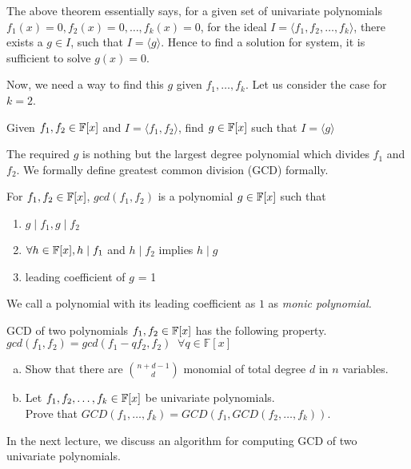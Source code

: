 The above theorem essentially says, 
for a given set of univariate polynomials $f_1(x)=0,f_2(x)=0,\ldots,f_k(x)=0$,
for the ideal $I=\langle f_1,f_2,\ldots,f_k\rangle $, there exists a $g\in I$, 
such that $I=\langle g\rangle $. Hence to find a solution for system, it 
is sufficient to solve $g(x)=0$. 

Now, we need a way to find this $g$ given $f_1,\ldots,f_k$. Let us consider
the case for $k=2$.
\begin{problem}
	Given $f_1, f_2 \in {\mathbb{F}}[x]$ and $I=\langle f_1,f_2\rangle $, 
	find $g \in {\mathbb{F}}[x]$ such that $I=\langle g\rangle $
\end{problem}
The required $g$ is nothing but the largest degree polynomial which divides
$f_1$ and $f_2$. We formally define greatest common division (GCD) formally.
\begin{definition}
	For $f_1,f_2 \in {\mathbb{F}}[x]$, $gcd(f_1,f_2)$ is a polynomial $g \in {\mathbb{F}}[x]$ 
	such that 
\begin{enumerate}
\item $g \mid f_1, g \mid f_2$
\item $\forall h \in {\mathbb{F}}[x], h \mid f_1 $ and $h \mid f_2$ implies $h \mid g$
\item leading coefficient of $g$ = 1 
\end{enumerate}
\end{definition}
We call a polynomial with its leading coefficient as $1$ as \emph{monic
polynomial.} 
\begin{observation}
	GCD of two polynomials $f_1,f_2 \in {\mathbb{F}}[x]$ has the following property.
$gcd(f_1, f_2) = gcd(f_1-qf_2,f_2)\;\;\forall q \in \mathbb{F}[x]$
\end{observation}

\begin{exercise}
\begin{enumerate}[(a)]
\item Show that there are ${n+d-1 \choose d}$ monomial of total degree $d$ in $n$ variables.
\item Let $f_1, f_2, \ldots, f_k \in {\mathbb{F}}[x]$ be univariate polynomials.\\
Prove that $GCD(f_1, \ldots, f_k) = GCD(f_1, GCD(f_2, \ldots, f_k))$.
\end{enumerate}
\end{exercise}





In the next lecture, we discuss an algorithm for computing GCD of two
univariate polynomials.
